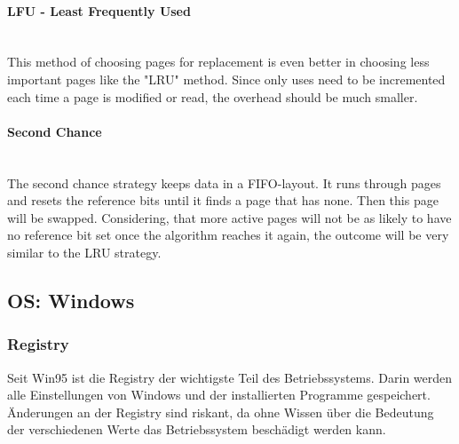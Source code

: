 \paragraph{LFU - Least Frequently Used}~\\
This method of choosing pages for replacement is even better in choosing less important pages like the "LRU" method. Since only uses need to be incremented each time a page is modified or read, the overhead should be much smaller.

\paragraph{Second Chance}~\\
The second chance strategy keeps data in a FIFO-layout. It runs through pages and resets the reference bits until it finds a page that has none. Then this page will be swapped. Considering, that more active pages will not be as likely to have no reference bit set once the algorithm reaches it again, the outcome will be very similar to the LRU strategy.

	
\subsection{OS: Windows}


\subsubsection{Registry}
Seit Win95 ist die Registry der wichtigste Teil des Betriebssystems. Darin werden alle Einstellungen von Windows und der installierten Programme gespeichert.
Änderungen an der Registry sind riskant, da ohne Wissen über die Bedeutung der verschiedenen Werte das Betriebssystem beschädigt werden kann.

